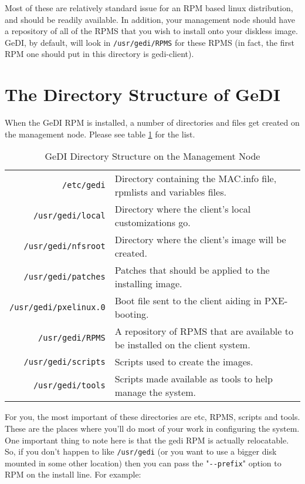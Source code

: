 \documentclass[10pt,a4paper,titlepage]{article}
\begin{document}
Most of these are relatively standard issue for an RPM based linux distribution,
and should be readily available.  In addition, your management node should have
a repository of all of the RPMS that you wish to install onto your diskless
image.  GeDI, by default, will look in \verb!/usr/gedi/RPMS! for these RPMS (in
fact, the first RPM one should put in this directory is gedi-client).

\section{The Directory Structure of GeDI}
When the GeDI RPM is installed, a number of directories and files get created on
the management node.  Please see table \ref{tab:dir} for the list.

\begin{table}[ht]
\centering
\caption{GeDI Directory Structure on the Management Node}
\begin{tabular}{rp{4in}}
\verb!/etc/gedi! & Directory containing the MAC.info file, rpmlists and variables files. \\
\verb!/usr/gedi/local! & Directory where the client's local customizations go. \\
\verb!/usr/gedi/nfsroot! & Directory where the client's image will be created. \\
\verb!/usr/gedi/patches! & Patches that should be applied to the installing image. \\
\verb!/usr/gedi/pxelinux.0! & Boot file sent to the client aiding in PXE-booting. \\
\verb!/usr/gedi/RPMS! & A repository of RPMS that are available to be installed on the client system. \\
\verb!/usr/gedi/scripts! & Scripts used to create the images. \\
\verb!/usr/gedi/tools! & Scripts made available as tools to help manage the system. \\
\end{tabular}
\label{tab:dir}
\end{table}

For you, the most important of these directories are etc, RPMS, scripts and
tools.  These are the places where you'll do most of your work in configuring
the system.  One important thing to note here is that the gedi RPM is actually
relocatable.  So, if you don't happen to like \verb!/usr/gedi! (or you want to
use a bigger disk mounted in some other location) then you can pass the
"\verb!--prefix!" option to RPM on the install line.  For example:
\end{document}
